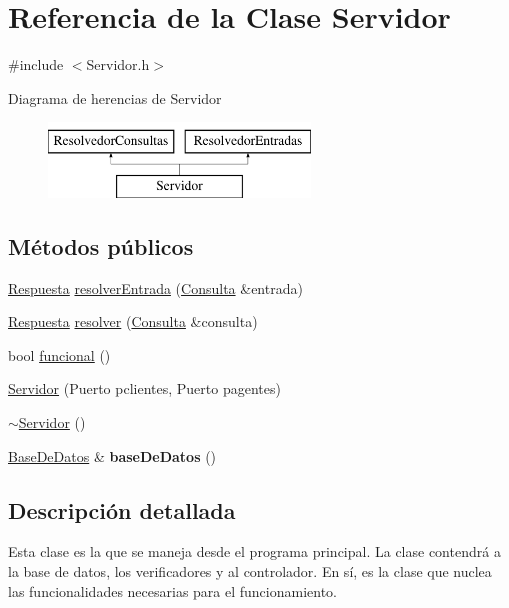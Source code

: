 \hypertarget{classServidor}{\section{\-Referencia de la \-Clase \-Servidor}
\label{classServidor}
}


{\ttfamily \#include $<$\-Servidor.\-h$>$}

\-Diagrama de herencias de \-Servidor\begin{figure}[H]
\begin{center}
\leavevmode
\includegraphics[height=2.000000cm]{classServidor}
\end{center}
\end{figure}
\subsection*{\-Métodos públicos}
\begin{DoxyCompactItemize}
\item 
\hyperlink{classRespuesta}{\-Respuesta} \hyperlink{classServidor_a2eb01d909e9206d9ab3722ccb1e38795}{resolver\-Entrada} (\hyperlink{classConsulta}{\-Consulta} \&entrada)
\item 
\hyperlink{classRespuesta}{\-Respuesta} \hyperlink{classServidor_a0ec43bd5d9e7c4e36149ba9c00198950}{resolver} (\hyperlink{classConsulta}{\-Consulta} \&consulta)
\item 
bool \hyperlink{classServidor_af86cf5fe5d72f3c41abd5b9c20160388}{funcional} ()
\item 
\hyperlink{classServidor_acdee1b67c33a2f8ec771fa685ade9096}{\-Servidor} (\-Puerto pclientes, \-Puerto pagentes)
\item 
\hyperlink{classServidor_a5ac1d9360e9c3010be4023f315cd64c1}{$\sim$\-Servidor} ()
\item 
\hypertarget{classServidor_adc64676e3415243151de5dbb2673e65a}{\hyperlink{classBaseDeDatos}{\-Base\-De\-Datos} \& {\bfseries base\-De\-Datos} ()}\label{classServidor_adc64676e3415243151de5dbb2673e65a}

\end{DoxyCompactItemize}


\subsection{\-Descripción detallada}
\-Esta clase es la que se maneja desde el programa principal. \-La clase contendrá a la base de datos, los verificadores y al controlador. \-En sí, es la clase que nuclea las funcionalidades necesarias para el funcionamiento.

